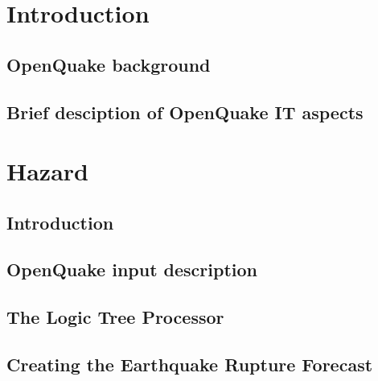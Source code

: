\documentclass[12pt,a4paper,headings=small,version=first,dvips]{scrbook}
\begin{document}
\part{Introduction}
\chapter{OpenQuake background}
	
\chapter{Brief desciption of OpenQuake IT aspects}
	
\part{Hazard}
\chapter{Introduction}
	
\chapter{OpenQuake input description}
	\label{chap:hazinp}
	
\chapter{The Logic Tree Processor}
	\label{chap:ltp}
	
\chapter{Creating the Earthquake Rupture Forecast}
	\label{chap:erf}
	
\end{document}
